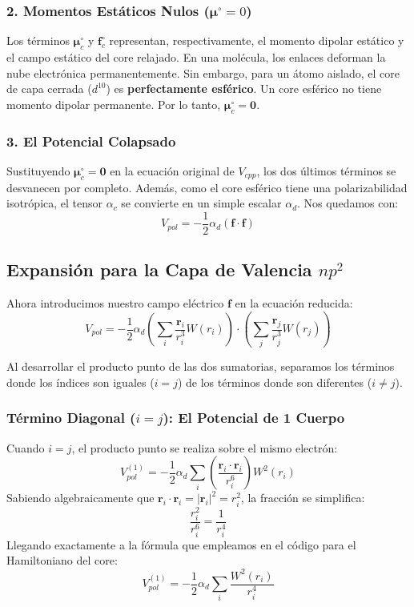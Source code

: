 \documentclass[11pt,a4paper]{article}
\begin{document}
\subsubsection{2. Momentos Estáticos Nulos ($\boldsymbol{\mu}^{\circ} = 0$)}
Los términos $\boldsymbol{\mu}_c^{\circ}$ y $\mathbf{f}_c^{\circ}$ representan, respectivamente, el momento dipolar estático y el campo estático del core relajado. 
En una molécula, los enlaces deforman la nube electrónica permanentemente. Sin embargo, para un átomo aislado, el core de capa cerrada ($d^{10}$) es \textbf{perfectamente esférico}. Un core esférico no tiene momento dipolar permanente. 
Por lo tanto, $\boldsymbol{\mu}_c^{\circ} = \mathbf{0}$.

\subsubsection{3. El Potencial Colapsado}
Sustituyendo $\boldsymbol{\mu}_c^{\circ} = \mathbf{0}$ en la ecuación original de $V_{cpp}$, los dos últimos términos se desvanecen por completo. Además, como el core esférico tiene una polarizabilidad isotrópica, el tensor $\alpha_c$ se convierte en un simple escalar $\alpha_d$. Nos quedamos con:
\begin{equation}
V_{pol} = -\frac{1}{2} \alpha_d (\mathbf{f} \cdot \mathbf{f})
\end{equation}


\subsection{Expansión para la Capa de Valencia $np^2$}
Ahora introducimos nuestro campo eléctrico $\mathbf{f}$ en la ecuación reducida:
\begin{equation}
V_{pol} = -\frac{1}{2} \alpha_d \left( \sum_i \frac{\mathbf{r}_i}{r_i^3} W(r_i) \right) \cdot \left( \sum_j \frac{\mathbf{r}_j}{r_j^3} W(r_j) \right)
\end{equation}

Al desarrollar el producto punto de las dos sumatorias, separamos los términos donde los índices son iguales ($i = j$) de los términos donde son diferentes ($i \neq j$).

\subsubsection{Término Diagonal ($i = j$): El Potencial de 1 Cuerpo}
Cuando $i = j$, el producto punto se realiza sobre el mismo electrón:
\begin{equation}
V_{pol}^{(1)} = -\frac{1}{2} \alpha_d \sum_i \left( \frac{\mathbf{r}_i \cdot \mathbf{r}_i}{r_i^6} \right) W^2(r_i)
\end{equation}
Sabiendo algebraicamente que $\mathbf{r}_i \cdot \mathbf{r}_i = |\mathbf{r}_i|^2 = r_i^2$, la fracción se simplifica:
\begin{equation}
\frac{r_i^2}{r_i^6} = \frac{1}{r_i^4}
\end{equation}
Llegando exactamente a la fórmula que empleamos en el código para el Hamiltoniano del core:
\begin{equation}
V_{pol}^{(1)} = -\frac{1}{2} \alpha_d \sum_i \frac{W^2(r_i)}{r_i^4}
\end{equation}
\end{document}
